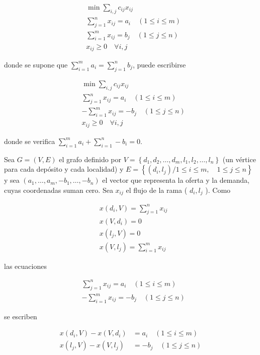 \documentclass[10pt]{article}
\begin{document}
$$
\begin{aligned}
& \min \sum_{i, j} c_{i j} x_{i j} \\
& \sum_{j=1}^{n} x_{i j}=a_{i} \quad(1 \leq i \leq m) \\
& \sum_{i=1}^{m} x_{i j}=b_{j} \quad(1 \leq j \leq n) \\
& x_{i j} \geq 0 \quad \forall i, j
\end{aligned}
$$

donde se supone que $\sum_{i=1}^{m} a_{i}=\sum_{j=1}^{n} b_{j}$, puede escribirse

$$
\begin{aligned}
& \min \sum_{i, j} c_{i j} x_{i j} \\
& \sum_{j=1}^{n} x_{i j}=a_{i} \quad(1 \leq i \leq m) \\
& -\sum_{i=1}^{m} x_{i j}=-b_{j} \quad(1 \leq j \leq n) \\
& x_{i j} \geq 0 \quad \forall i, j
\end{aligned}
$$

donde se verifica $\sum_{i=1}^{m} a_{i}+\sum_{i=1}^{n}-b_{i}=0$.

Sea $G=(V, E)$ el grafo definido por $V=\left\{d_{1}, d_{2}, \ldots, d_{m}, l_{1}, l_{2}, \ldots, l_{n}\right\}$ (un vértice para cada depósito y cada localidad) y $E=\left\{\left(d_{i}, l_{j}\right) / 1 \leq i \leq m, \quad 1 \leq j \leq n\right\}$ y sea $\left(a_{1}, \ldots, a_{m},-b_{1}, \ldots,-b_{n}\right)$ el vector que representa la oferta y la demanda, cuyas coordenadas suman cero. Sea $x_{i j}$ el flujo de la rama ( $d_{i}, l_{j}$ ). Como

$$
\begin{aligned}
& x\left(d_{i}, V\right)=\sum_{j=1}^{n} x_{i j} \\
& x\left(V, d_{i}\right)=0 \\
& x\left(l_{j}, V\right)=0 \\
& x\left(V, l_{j}\right)=\sum_{i=1}^{m} x_{i j}
\end{aligned}
$$

las ecuaciones

$$
\begin{aligned}
& \sum_{j=1}^{n} x_{i j}=a_{i} \quad(1 \leq i \leq m) \\
& -\sum_{i=1}^{m} x_{i j}=-b_{j} \quad(1 \leq j \leq n)
\end{aligned}
$$

se escriben

$$
\begin{aligned}
x\left(d_{i}, V\right)-x\left(V, d_{i}\right) & =a_{i} \quad(1 \leq i \leq m) \\
x\left(l_{j}, V\right)-x\left(V, l_{j}\right) & =-b_{j} \quad(1 \leq j \leq n)
\end{aligned}
$$
\end{document}
